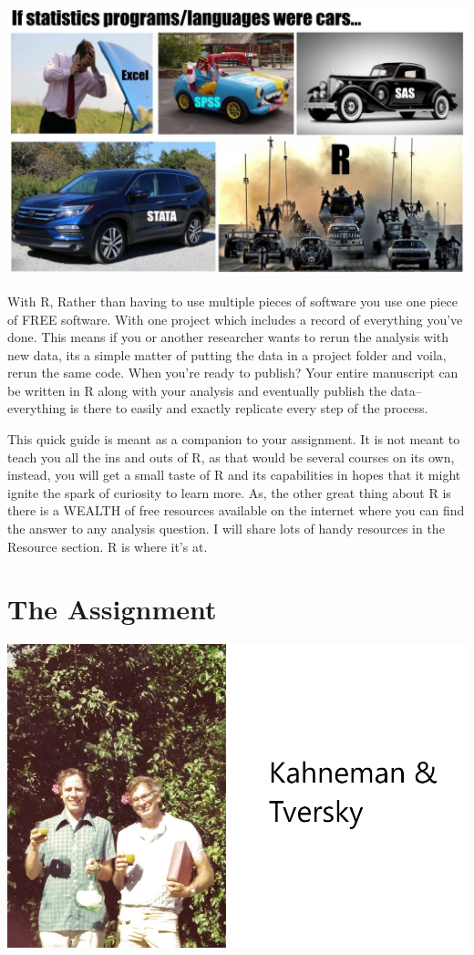 \documentclass[
]{html}
\theoremstyle{definition}
\theoremstyle{definition}
\theoremstyle{definition}
\theoremstyle{definition}
\theoremstyle{remark}
\begin{document}
\includegraphics[width=1\linewidth]{images/WhyR}

With R, Rather than having to use multiple pieces of software you use one piece of FREE software. With one project which includes a record of everything you've done. This means if you or another researcher wants to rerun the analysis with new data, its a simple matter of putting the data in a project folder and voila, rerun the same code. When you're ready to publish? Your entire manuscript can be written in R along with your analysis and eventually publish the data--everything is there to easily and exactly replicate every step of the process.

This quick guide is meant as a companion to your assignment. It is not meant to teach you all the ins and outs of R, as that would be several courses on its own, instead, you will get a small taste of R and its capabilities in hopes that it might ignite the spark of curiosity to learn more. As, the other great thing about R is there is a WEALTH of free resources available on the internet where you can find the answer to any analysis question. I will share lots of handy resources in the Resource section. R is where it's at.

\hypertarget{cross}{%
\section{The Assignment}\label{cross}}

\includegraphics[width=1\linewidth]{images/Kahneman&Tversky}
\end{document}
